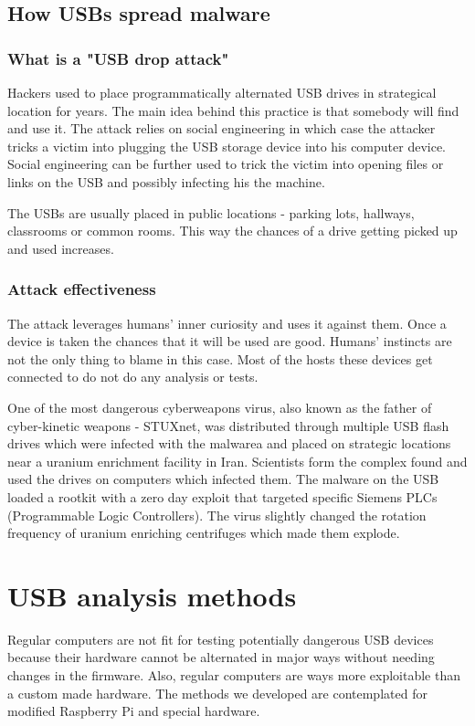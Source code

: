 \documentclass[sigconf]{acmart}
\begin{document}
\subsection{How USBs spread malware}
\subsubsection{What is a "USB drop attack"}
\par \quad Hackers used to place programmatically alternated USB drives in strategical location for years. The main idea behind this practice is that somebody will find and use it. The attack relies on social engineering in which case the attacker tricks a victim into plugging the USB storage device into his computer device. Social engineering can be further used to trick the victim into opening files or links on the USB and possibly infecting his the machine.
\par The USBs are usually placed in public locations - parking lots, hallways, classrooms or common rooms. This way the chances of a drive getting picked up and used increases.

\subsubsection{Attack effectiveness}
\par \quad The attack leverages humans' inner curiosity \cite{usb_drop_attack} and uses it against them. Once a device is taken the chances that it will be used are good. Humans' instincts are not the only thing to blame in this case. Most of the hosts these devices get connected to do not do any analysis or tests.
\par One of the most  dangerous cyberweapons virus, also known as the father of cyber-kinetic weapons \cite{stuxnet_father_of_kin_cyb_weapons} - STUXnet, was distributed through multiple USB flash drives which were infected with the malwarea and placed on strategic locations near a uranium enrichment facility in Iran. Scientists form the complex found and used the drives on computers which infected them. The malware on the USB loaded a rootkit with a zero day exploit that targeted specific Siemens PLCs (Programmable Logic Controllers). The virus slightly changed the rotation frequency of uranium enriching centrifuges which made them explode.

\section{USB analysis methods}
\par \quad Regular computers are not fit for testing potentially dangerous USB devices because their hardware cannot be alternated in major ways without needing changes in the firmware. Also, regular computers are ways more exploitable than a custom made hardware.
The methods we developed are contemplated for modified Raspberry Pi and special hardware.
\end{document}
